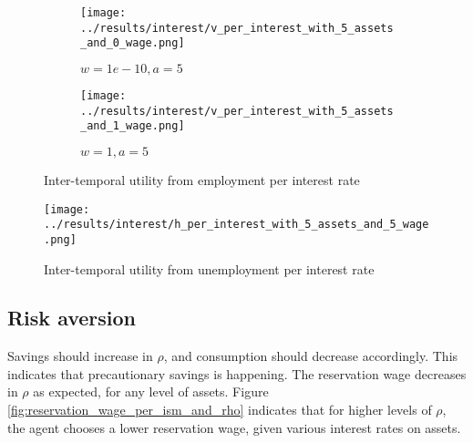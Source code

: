 \documentclass[12pt]{article}
\begin{document}
\begin{figure}[hbt!]

\begin{subfigure}{0.5\textwidth}
\texttt{[image: ../results/interest/v\_per\_interest\_with\_5\_assets\_and\_0\_wage.png]} \caption{$w=1e-10, a=5$}
\end{subfigure}%
\begin{subfigure}{0.5\textwidth}
\texttt{[image: ../results/interest/v\_per\_interest\_with\_5\_assets\_and\_1\_wage.png]}
\caption{$w=1, a=5$}
\end{subfigure}

\caption{Inter-temporal utility from employment per interest rate}
\label{fig:v_per_interest}
\end{figure}


\begin{figure}[hbt!]
\centering
\texttt{[image: ../results/interest/h\_per\_interest\_with\_5\_assets\_and\_5\_wage.png]}
\caption{Inter-temporal utility from unemployment per interest rate}
\label{fig:h_per_interest}
\end{figure}


\clearpage

\subsection{Risk aversion}

Savings should increase in $\rho$, and consumption should decrease accordingly. This indicates that precautionary savings is happening. The reservation wage decreases in $\rho$ as expected, for any level of assets. Figure \ref{fig:reservation_wage_per_ism_and_rho} indicates that for higher levels of $\rho$, the agent chooses a lower reservation wage, given various interest rates on assets.
\end{document}
